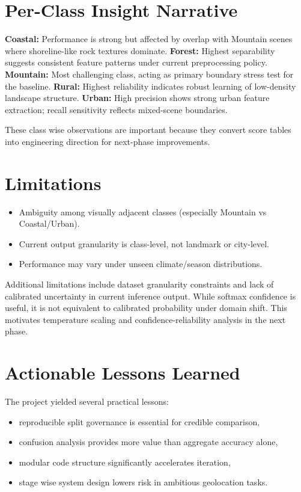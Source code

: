 \section{Per-Class Insight Narrative}
\textbf{Coastal:} Performance is strong but affected by overlap with Mountain scenes where shoreline-like rock textures dominate.\newline
\textbf{Forest:} Highest separability suggests consistent feature patterns under current preprocessing policy.\newline
\textbf{Mountain:} Most challenging class, acting as primary boundary stress test for the baseline.\newline
\textbf{Rural:} Highest reliability indicates robust learning of low-density landscape structure.\newline
\textbf{Urban:} High precision shows strong urban feature extraction; recall sensitivity reflects mixed-scene boundaries.

These class wise observations are important because they convert score tables into engineering direction for next-phase improvements.

\section{Limitations}
\begin{itemize}
\item Ambiguity among visually adjacent classes (especially Mountain vs Coastal/Urban).
\item Current output granularity is class-level, not landmark or city-level.
\item Performance may vary under unseen climate/season distributions.
\end{itemize}

Additional limitations include dataset granularity constraints and lack of calibrated uncertainty in current inference output. While softmax confidence is useful, it is not equivalent to calibrated probability under domain shift. This motivates temperature scaling and confidence-reliability analysis in the next phase.

\section{Actionable Lessons Learned}
The project yielded several practical lessons:
\begin{itemize}
\item reproducible split governance is essential for credible comparison,
\item confusion analysis provides more value than aggregate accuracy alone,
\item modular code structure significantly accelerates iteration,
\item stage wise system design lowers risk in ambitious geolocation tasks.
\end{itemize}

